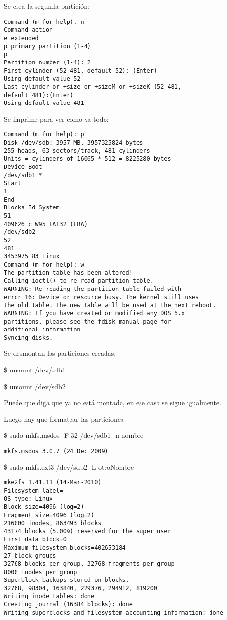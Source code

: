 Se crea la segunda partición: 

\begin{verbatim}
Command (m for help): n 
Command action 
e extended 
p primary partition (1-4) 
p 
Partition number (1-4): 2 
First cylinder (52-481, default 52): (Enter) 
Using default value 52 
Last cylinder or +size or +sizeM or +sizeK (52-481, 
default 481):(Enter) 
Using default value 481 
\end{verbatim}

Se imprime para ver como va todo: 

\begin{verbatim}
Command (m for help): p 
Disk /dev/sdb: 3957 MB, 3957325824 bytes 
255 heads, 63 sectors/track, 481 cylinders 
Units = cylinders of 16065 * 512 = 8225280 bytes 
Device Boot 
/dev/sdb1 * 
Start 
1 
End 
Blocks Id System 
51 
409626 c W95 FAT32 (LBA) 
/dev/sdb2 
52 
481 
3453975 83 Linux 
Command (m for help): w 
The partition table has been altered! 
Calling ioctl() to re-read partition table. 
WARNING: Re-reading the partition table failed with 
error 16: Device or resource busy. The kernel still uses 
the old table. The new table will be used at the next reboot. 
WARNING: If you have created or modified any DOS 6.x 
partitions, please see the fdisk manual page for 
additional information. 
Syncing disks. 
\end{verbatim}

Se desmontan las particiones creadas: 

\bigskip
\centerline{\$ umount /dev/sdb1}

\centerline{\$ umount /dev/sdb2}

\bigskip
Puede que diga que ya no está montado, en ese caso se sigue igualmente. 

\bigskip
Luego hay que formatear las particiones: 

\bigskip
\centerline{\$ sudo mkfs.msdos -F 32 /dev/sdb1 -n nombre}

\begin{verbatim}
mkfs.msdos 3.0.7 (24 Dec 2009) 
\end{verbatim}

\centerline{\$ sudo mkfs.ext3 /dev/sdb2 -L otroNombre}
\begin{verbatim}
mke2fs 1.41.11 (14-Mar-2010) 
Filesystem label= 
OS type: Linux 
Block size=4096 (log=2) 
Fragment size=4096 (log=2) 
216000 inodes, 863493 blocks 
43174 blocks (5.00%) reserved for the super user 
First data block=0 
Maximum filesystem blocks=402653184 
27 block groups 
32768 blocks per group, 32768 fragments per group 
8000 inodes per group 
Superblock backups stored on blocks: 
32768, 98304, 163840, 229376, 294912, 819200 
Writing inode tables: done 
Creating journal (16384 blocks): done 
Writing superblocks and filesystem accounting information: done
\end{verbatim}

